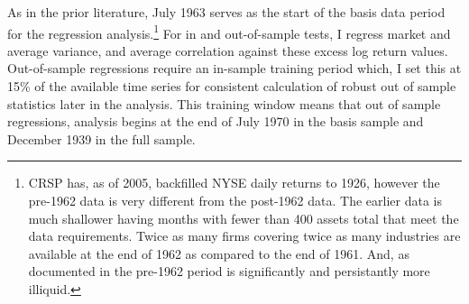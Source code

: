 As in the prior literature, July 1963 serves as the start of the basis data period for the regression analysis.\footnote{CRSP has, as of 2005, backfilled NYSE daily returns to 1926, however the pre-1962 data is very different from the post-1962 data. The earlier data is much shallower having months with fewer than 400 assets total that meet the data requirements. Twice as many firms covering twice as many industries are available at the end of 1962 as compared to the end of 1961. And, as documented in \citet{jones_century_2002} the pre-1962 period is significantly and persistantly more illiquid.} For in and out-of-sample tests, I regress market and average variance, and average correlation against these excess log return values. Out-of-sample regressions require an in-sample training period which, I set this at 15\% of the available time series for consistent calculation of robust out of sample statistics later in the analysis. This training window means that out of sample regressions, analysis begins at the end of July 1970 in the basis sample and December 1939 in the
full sample.

